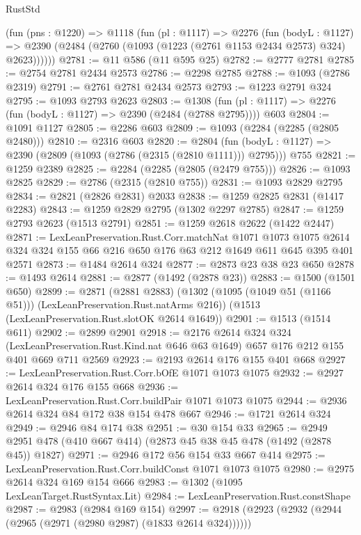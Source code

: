 \begin{lexlean}{RustStd}
\begin{coremodule}
{\begin{coremodule}
{{{{{{{{    (fun (pns : @1220) =>
    @1118
      (fun (pl : @1117) =>
      @2276
        (fun (bodyL : @1127) =>
        @2390 (@2484 (@2760 (@1093 (@1223 (@2761 @1153 @2434 @2573) @324) @2623))))))
@2781 := @11 @586 (@11 @595 @25)
@2782 := @2777 @2781
@2785 := @2754 @2781 @2434 @2573
@2786 := @2298 @2785
@2788 := @1093 (@2786 @2319)
@2791 := @2761 @2781 @2434 @2573
@2793 := @1223 @2791 @324
@2795 := @1093 @2793 @2623
@2803 := @1308 (fun (pl : @1117) => @2276 (fun (bodyL : @1127) => @2390 (@2484 (@2788 @2795)))) @603
@2804 := @1091 @1127
@2805 := @2286 @603
@2809 := @1093 (@2284 (@2285 (@2805 @2480)))
@2810 := @2316 @603
@2820 := @2804
    (fun (bodyL : @1127) => @2390 (@2809 (@1093 (@2786 (@2315 (@2810 @1111))) @2795)))
    @755
@2821 := @1259 @2389
@2825 := @2284 (@2285 (@2805 (@2479 @755)))
@2826 := @1093 @2825
@2829 := @2786 (@2315 (@2810 @755))
@2831 := @1093 @2829 @2795
@2834 := @2821 (@2826 @2831) @2033
@2838 := @1259 @2825 @2831 (@1417 @2283)
@2843 := @1259 @2829 @2795 (@1302 @2297 @2785)
@2847 := @1259 @2793 @2623 (@1513 @2791)
@2851 := @1259 @2618 @2622 (@1422 @2447)
@2871 := LexLeanPreservation.Rust.Corr.matchNat
    @1071
    @1073
    @1075
    @2614
    @324
    @324
    @155
    @66
    @216
    @650
    @176
    @63
    @212
    @1649
    @611
    @645
    @395
    @401
    @2571
@2873 := @1484 @2614 @324
@2877 := @2873 @23 @38 @23 @650
@2878 := @1493 @2614
@2881 := @2877 (@1492 (@2878 @23))
@2883 := @1500 (@1501 @650)
@2899 := @2871
    (@2881 @2883)
    (@1302 (@1095 (@1049 @51 (@1166 @51))) (LexLeanPreservation.Rust.natArms @216))
    (@1513 (LexLeanPreservation.Rust.slotOK @2614 @1649))
@2901 := @1513 (@1514 @611)
@2902 := @2899 @2901
@2918 := @2176
    @2614
    @324
    @324
    (LexLeanPreservation.Rust.Kind.nat @646 @63 @1649)
    @657
    @176
    @212
    @155
    @401
    @669
    @711
    @2569
@2923 := @2193 @2614 @176 @155 @401 @668
@2927 := LexLeanPreservation.Rust.Corr.bOfE @1071 @1073 @1075
@2932 := @2927 @2614 @324 @176 @155 @668
@2936 := LexLeanPreservation.Rust.Corr.buildPair @1071 @1073 @1075
@2944 := @2936 @2614 @324 @84 @172 @38 @154 @478 @667
@2946 := @1721 @2614 @324
@2949 := @2946 @84 @174 @38
@2951 := @30 @154 @33
@2965 := @2949 @2951 @478 (@410 @667 @414) (@2873 @45 @38 @45 @478 (@1492 (@2878 @45)) @1827)
@2971 := @2946 @172 @56 @154 @33 @667 @414
@2975 := LexLeanPreservation.Rust.Corr.buildConst @1071 @1073 @1075
@2980 := @2975 @2614 @324 @169 @154 @666
@2983 := @1302 (@1095 LexLeanTarget.RustSyntax.Lit)
@2984 := LexLeanPreservation.Rust.constShape
@2987 := @2983 (@2984 @169 @154)
@2997 := @2918 (@2923 (@2932 (@2944 (@2965 (@2971 (@2980 @2987) (@1833 @2614 @324))))))
}}}}}}}}
\end{coremodule}}
\end{coremodule}
\end{lexlean}
